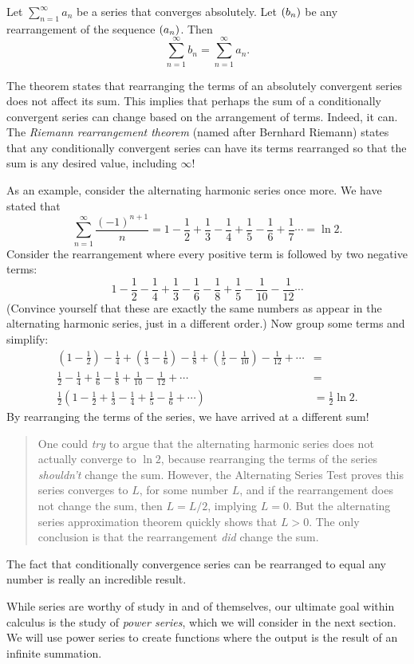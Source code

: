 \documentclass{ximera}
\begin{document}
\begin{theorem}
  Let $\sum_{n=1}^\infty a_n$ be a series that converges absolutely.
  Let $\left( b_n \right)$ be any rearrangement of the sequence
  $\left( a_n \right)$. Then
  \[
  \sum_{n=1}^\infty b_n = \sum_{n=1}^\infty a_n.
  \]
\end{theorem}

The theorem states that rearranging the terms of an absolutely
convergent series does not affect its sum. This implies that perhaps
the sum of a conditionally convergent series can change based on the
arrangement of terms. Indeed, it can. The \textit{Riemann
  rearrangement theorem} (named after Bernhard Riemann) states that
any conditionally convergent series can have its terms rearranged so
that the sum is any desired value, including $\infty$!


As an example, consider the alternating harmonic series once more. We
have stated that
\[
\sum_{n=1}^\infty \frac{(-1)^{n+1}}{n} =1-\frac12+\frac13-\frac14+\frac15-\frac16+\frac17\cdots = \ln 2.
\]
Consider the rearrangement where every positive term is followed by two negative terms:
\[
1-\frac12-\frac14+\frac13-\frac16-\frac18+\frac15-\frac1{10}-\frac1{12}\cdots
\]
(Convince yourself that these are exactly the same numbers as appear
in the alternating harmonic series, just in a different order.) Now
group some terms and simplify:
\begin{align*}
\left(1-\frac12\right)-\frac14+\left(\frac13-\frac16\right)-\frac18+\left(\frac15-\frac1{10}\right)-\frac1{12}+\cdots &= \\
\frac12-\frac14+\frac16-\frac18+\frac1{10}-\frac{1}{12}+\cdots &= \\
\frac12\left(1-\frac12+\frac13-\frac14+\frac15-\frac16+\cdots\right) & = \frac12\ln 2.
\end{align*}
By rearranging the terms of the series, we have arrived at a different
sum!
\begin{quote}
  One could \textit{try} to argue that the alternating harmonic series
  does not actually converge to $\ln 2$, because rearranging the terms
  of the series \textit{shouldn't} change the sum. However, the
  Alternating Series Test proves this series converges to $L$, for
  some number $L$, and if the rearrangement does not change the sum,
  then $L = L/2$, implying $L=0$. But the alternating series
  approximation theorem quickly shows that $L>0$. The only conclusion
  is that the rearrangement \textit{did} change the sum.
\end{quote}
The fact that conditionally convergence series can be rearranged to
equal any number is really an incredible result.



While series are worthy of study in and of themselves, our ultimate
goal within calculus is the study of \textit{power series}, which we
will consider in the next section. We will use power series to create
functions where the output is the result of an infinite summation.

\end{document}
